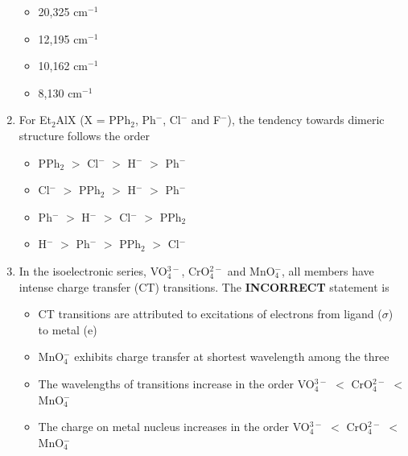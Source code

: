 \documentclass[journal,12pt,onecolumn]{IEEEtran}
\theoremstyle{remark}
\begin{document}
\begin{enumerate}
\begin{multicols}{2}
\begin{itemize}[label=(A)]
    \item 20,325 cm$^{-1}$
    \item 12,195 cm$^{-1}$
    \item 10,162 cm$^{-1}$
    \item 8,130 cm$^{-1}$
\end{itemize}
\end{multicols}
 

\item    \hspace{0.5cm} For Et$_2$AlX (X = PPh$_2$, Ph$^-$, Cl$^-$ and F$^-$), the tendency towards dimeric structure follows the order  \hfill{}

\begin{multicols}{2}
\begin{itemize}[label=(A)]
    \item PPh$_2$ $>$ Cl$^-$ $>$ H$^-$ $>$ Ph$^-$
    \item Cl$^-$ $>$ PPh$_2$ $>$ H$^-$ $>$ Ph$^-$
    \item Ph$^-$ $>$ H$^-$ $>$ Cl$^-$ $>$ PPh$_2$
    \item H$^-$ $>$ Ph$^-$ $>$ PPh$_2$ $>$ Cl$^-$
\end{itemize}
\end{multicols}
 

\item    \hspace{0.5 cm} In the isoelectronic series, VO$_4^{3-}$, CrO$_4^{2-}$ and MnO$_4^-$, all members have intense charge transfer (CT) transitions. The \textbf{INCORRECT} statement is  \hfill{}

\begin{multicols}{2}
\begin{itemize}[label=(A)]
    \item CT transitions are attributed to excitations of electrons from ligand ($\sigma$) to metal (e)
    \item MnO$_4^-$ exhibits charge transfer at shortest wavelength among the three
    \item The wavelengths of transitions increase in the order VO$_4^{3-}$ $<$ CrO$_4^{2-}$ $<$ MnO$_4^-$
    \item The charge on metal nucleus increases in the order VO$_4^{3-}$ $<$ CrO$_4^{2-}$ $<$ MnO$_4^-$
\end{itemize}
\end{multicols}
 


\end{enumerate}
\end{document}
